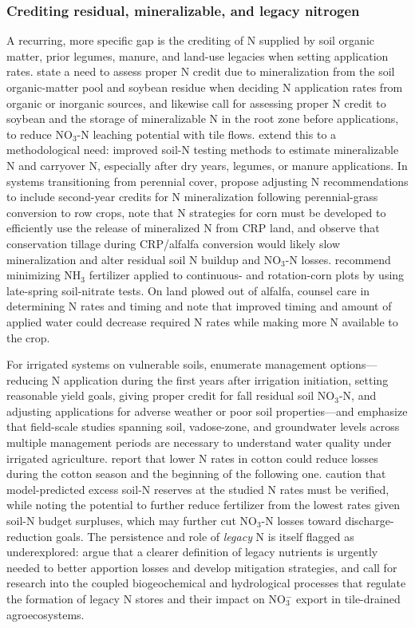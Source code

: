 \subsubsection{Crediting residual, mineralizable, and legacy nitrogen}
A recurring, more specific gap is the crediting of N supplied by soil organic matter, prior legumes, manure, and land-use legacies when setting application rates. \textcite{Bakhsh2007} state a need to assess proper N credit due to mineralization from the soil organic-matter pool and soybean residue when deciding N application rates from organic or inorganic sources, and \textcite{Bakhsh2005} likewise call for assessing proper N credit to soybean and the storage of mineralizable N in the root zone before applications, to reduce NO$_3$-N leaching potential with tile flows. \textcite{Randall2001} extend this to a methodological need: improved soil-N testing methods to estimate mineralizable N and carryover N, especially after dry years, legumes, or manure applications. In systems transitioning from perennial cover, \textcite{Huggins2001} propose adjusting N recommendations to include second-year credits for N mineralization following perennial-grass conversion to row crops, note that N strategies for corn must be developed to efficiently use the release of mineralized N from CRP land, and observe that conservation tillage during CRP/alfalfa conversion would likely slow mineralization and alter residual soil N buildup and NO$_3$-N losses. \textcite{Weed1996} recommend minimizing NH$_3$ fertilizer applied to continuous- and rotation-corn plots by using late-spring soil-nitrate tests. On land plowed out of alfalfa, \textcite{ROBBINS1980} counsel care in determining N rates and timing and note that improved timing and amount of applied water could decrease required N rates while making more N available to the crop.

For irrigated systems on vulnerable soils, \textcite{Derby2009} enumerate management options---reducing N application during the first years after irrigation initiation, setting reasonable yield goals, giving proper credit for fall residual soil NO$_3$-N, and adjusting applications for adverse weather or poor soil properties---and emphasize that field-scale studies spanning soil, vadose-zone, and groundwater levels across multiple management periods are necessary to understand water quality under irrigated agriculture. \textcite{Hurtado2011} report that lower N rates in cotton could reduce losses during the cotton season and the beginning of the following one. \textcite{Ale2012b} caution that model-predicted excess soil-N reserves at the studied N rates must be verified, while noting the potential to further reduce fertilizer from the lowest rates given soil-N budget surpluses, which may further cut NO$_3$-N losses toward discharge-reduction goals. The persistence and role of \emph{legacy} N is itself flagged as underexplored: \textcite{Williams2022} argue that a clearer definition of legacy nutrients is urgently needed to better apportion losses and develop mitigation strategies, and \textcite{Hu2024} call for research into the coupled biogeochemical and hydrological processes that regulate the formation of legacy N stores and their impact on NO$_3^-$ export in tile-drained agroecosystems.

